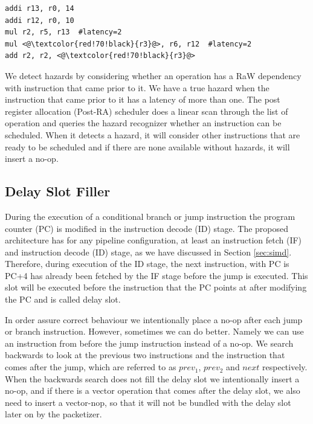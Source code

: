 \lstset{style=customasm}
\begin{lstlisting}
addi r13, r0, 14
addi r12, r0, 10
mul r2, r5, r13  #latency=2
mul <@\textcolor{red!70!black}{r3}@>, r6, r12  #latency=2
add r2, r2, <@\textcolor{red!70!black}{r3}@>
\end{lstlisting}

We detect hazards by considering whether an operation has a RaW dependency with instruction that came prior to it. We have a true hazard when the instruction that came prior to it has a latency of more than one. The post register allocation (Post-RA) scheduler does a linear scan through the list of operation and queries the hazard recognizer whether an instruction can be scheduled. When it detects a hazard, it will consider other instructions that are ready to be scheduled and if there are none available without hazards, it will insert a no-op.

\subsection{Delay Slot Filler}
During the execution of a conditional branch or jump instruction the program counter (PC) is modified in the instruction decode (ID) stage. The proposed architecture has for any pipeline configuration, at least an instruction fetch (IF) and instruction decode (ID) stage, as we have discussed in Section \ref{sec:simd}. Therefore, during execution of the ID stage, the next instruction, with PC is PC+4 has already been fetched by the IF stage before the jump is executed. This slot will be executed before the instruction that the PC points at after modifying the PC and is called delay slot. %

In order assure correct behaviour we intentionally 
place a no-op after each jump or branch instruction. However, sometimes we can do better. Namely we can use an instruction from before the jump instruction instead of a no-op. We search backwards to look at the previous two instructions and the instruction that comes after the jump, which are referred to as $prev_1$, $prev_2$ and $next$ respectively. When the backwards search does not fill the delay slot we intentionally insert a no-op, and if there is a vector operation that comes after the delay slot, we also need to insert a vector-nop, so that it will not be bundled with the delay slot later on by the packetizer.

